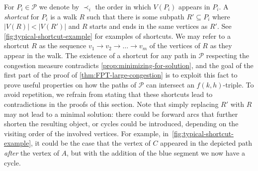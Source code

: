 \documentclass[a4paper,UKenglish,cleveref, autoref, thm-restate]{lipics-v2021}
\begin{document}
For $P_i \in \mathcal{P}$ we denote by $\prec_{i}$ the order in which $V(P_i)$ appears in $P_i$.
A \emph{shortcut} for $P_i$ is a walk $R$ such that there is some subpath $R' \subseteq P_i$
where $|V(R)| < |V(R')|$ and $R$ starts and ends in the same vertices as $R'$.
See
\autoref{fig:typical-shortcut-example} for
examples of shortcuts.
We may refer to a shortcut $R$ as the sequence $v_1 \to v_2 \to \ldots \to v_m$
of the vertices of $R$ as they appear in the walk.
The existence of a shortcut for any path in $\mathcal{P}$ respecting the congestion
measure contradicts \autoref{prop:minimizing-for-solution},
and the goal of the first part of the proof of
\autoref{thm:FPT-large-congestion} is to exploit
this fact to prove useful properties on how the paths of $\mathcal{P}$ can
intersect an $f(k,h)$-triple.
To avoid repetition, we refrain from stating that these shortcuts lead to
contradictions in the proofs of this section.
Note that simply replacing $R'$ with $R$ may not lead to a minimal solution: there could be forward arcs that further shorten the resulting object, or cycles could be introduced, depending on the visiting order of the involved vertices. For example, in~\autoref{fig:typical-shortcut-example}, it could be the case that the vertex of $C$ appeared in the depicted path \emph{after} the vertex of $A$, but with the addition of the blue segment we now have a cycle.
\end{document}
